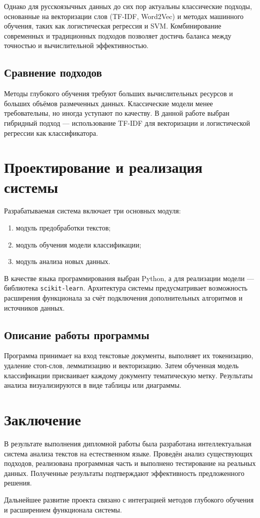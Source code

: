 \documentclass[14pt,a4paper]{extarticle}
\begin{document}
Однако для русскоязычных данных до сих пор актуальны классические подходы, основанные на векторизации слов (TF-IDF, Word2Vec) и методах машинного обучения, таких как логистическая регрессия и SVM. 
Комбинирование современных и традиционных подходов позволяет достичь баланса между точностью и вычислительной эффективностью.

\subsection{Сравнение подходов}
Методы глубокого обучения требуют больших вычислительных ресурсов и больших объёмов размеченных данных. 
Классические модели менее требовательны, но иногда уступают по качеству. 
В данной работе выбран гибридный подход — использование TF-IDF для векторизации и логистической регрессии как классификатора.

\newpage
\section{Проектирование и реализация системы}
Разрабатываемая система включает три основных модуля:
\begin{enumerate}
    \item модуль предобработки текстов;
    \item модуль обучения модели классификации;
    \item модуль анализа новых данных.
\end{enumerate}

В качестве языка программирования выбран Python, а для реализации модели — библиотека \texttt{scikit-learn}. 
Архитектура системы предусматривает возможность расширения функционала за счёт подключения дополнительных алгоритмов и источников данных.

\subsection{Описание работы программы}
Программа принимает на вход текстовые документы, выполняет их токенизацию, удаление стоп-слов, лемматизацию и векторизацию. 
Затем обученная модель классификации присваивает каждому документу тематическую метку. 
Результаты анализа визуализируются в виде таблицы или диаграммы.

\newpage
\section*{Заключение}
В результате выполнения дипломной работы была разработана интеллектуальная система анализа текстов на естественном языке. 
Проведён анализ существующих подходов, реализована программная часть и выполнено тестирование на реальных данных. 
Полученные результаты подтверждают эффективность предложенного решения.

Дальнейшее развитие проекта связано с интеграцией методов глубокого обучения и расширением функционала системы.
\end{document}
